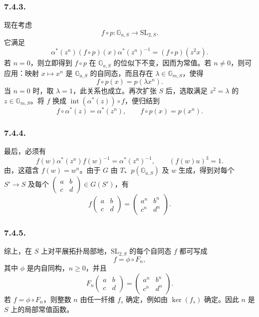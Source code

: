 \subsubsection*{7.4.3.}
现在考虑
\[
  f\circ p:\mathbb G_{a,S}\longrightarrow\mathrm{SL}_{2,S}.
\]
它满足
\[
  \alpha^*(z^n)(f\circ p)(x)\alpha^*(z^n)^{-1}
  =
  (f\circ p)(z^2x).
\]
若 \(n=0\)，则立即得到 \(f\circ p\) 在 \(\mathbb G_{a,S}\) 的位似下不变，因而为常值。若 \(n\neq0\)，则可应用：映射 \(x\mapsto x^n\) 是 \(\mathbb G_{a,S}\) 的自同态，而且存在 \(\lambda\in\mathbb G_{m,S}\)，使得
\[
  f\circ p(x)=p(\lambda x^n).
\]
当 \(n=0\) 时，取 \(\lambda=1\)，此关系也成立。再次扩张 \(S\) 后，选取满足 \(z^2=\lambda\) 的 \(z\in\mathbb G_{m,S}\)。将 \(f\) 换成 \(\operatorname{int}(\alpha^*(z))\circ f\)，便归结到
\[
  f\circ\alpha^*(z)=\alpha^*(z^n),
  \qquad
  f\circ p(x)=p(x^n).
\]

\subsubsection*{7.4.4.}
最后，必须有
\[
  f(w)\alpha^*(z^n)f(w)^{-1}=\alpha^*(z^n)^{-1},
  \qquad
  (f(w)u)^3=1.
\]
由，这蕴含 \(f(w)=w^n\)。由于 \(G\) 由 \(T\)、\(p(\mathbb G_{a,S})\) 及 \(w\) 生成，得到对每个 \(S'\to S\) 及每个 \(\begin{pmatrix}a&b\\c&d\end{pmatrix}\in G(S')\)，有
\[
  f\!\begin{pmatrix}a&b\\c&d\end{pmatrix}
  =
  \begin{pmatrix}a^n&b^n\\c^n&d^n\end{pmatrix}.
\]

\subsubsection*{7.4.5.}
综上，在 \(S\) 上对平展拓扑局部地，\(\mathrm{SL}_{2,S}\) 的每个自同态 \(f\) 都可写成
\[
  f=\phi\circ F_n,
\]
其中 \(\phi\) 是内自同构，\(n\geq0\)，并且
\[
  F_n\!\begin{pmatrix}a&b\\c&d\end{pmatrix}
  =
  \begin{pmatrix}a^n&b^n\\c^n&d^n\end{pmatrix}.
\]
若 \(f=\phi\circ F_n\)，则整数 \(n\) 由任一纤维 \(f_s\) 确定，例如由 \(\ker(f_s)\) 确定。因此 \(n\) 是 \(S\) 上的局部常值函数。

